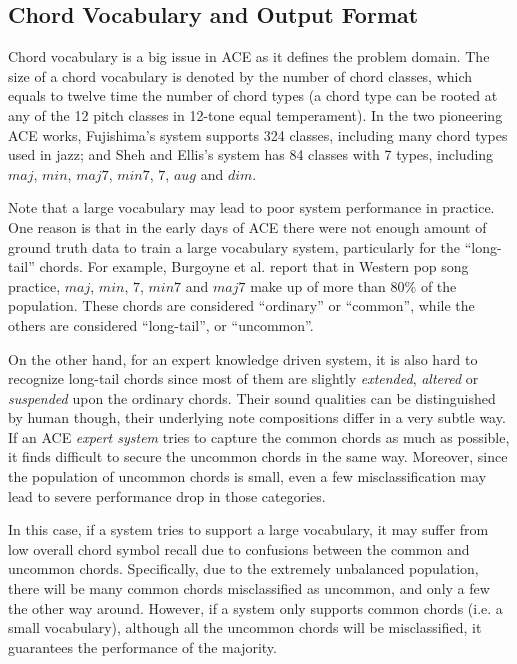 \subsection{Chord Vocabulary and Output Format} \label{sec:2-vocab}
Chord vocabulary is a big issue in ACE as it defines the problem domain. The size of a chord vocabulary is denoted by the number of chord classes, which equals to twelve time the number of chord types (a chord type can be rooted at any of the 12 pitch classes in 12-tone equal temperament). In the two pioneering ACE works, Fujishima's system \cite{fujishima1999realtime} supports 324 classes, including many chord types used in jazz; and Sheh and Ellis's system \cite{sheh2003chord} has 84 classes with 7 types, including $maj$, $min$, $maj7$, $min7$, $7$, $aug$ and $dim$.

Note that a large vocabulary may lead to poor system performance in practice. One reason is that in the early days of ACE there were not enough amount of ground truth data to train a large vocabulary system, particularly for the ``long-tail'' chords. For example, Burgoyne et al. \cite{burgoyne2011expert} report that in Western pop song practice, $maj$, $min$, $7$, $min7$ and $maj7$ make up of more than $80\%$ of the population. These chords are considered ``ordinary'' or ``common'', while the others are considered ``long-tail'', or ``uncommon''.

On the other hand, for an expert knowledge driven system, it is also hard to recognize long-tail chords since most of them are slightly {\it extended}, {\it altered} or {\it suspended} upon the ordinary chords. Their sound qualities can be distinguished by human though, their underlying note compositions differ in a very subtle way. If an ACE {\it expert system} tries to capture the common chords as much as possible, it finds difficult to secure the uncommon chords in the same way. Moreover, since the population of uncommon chords is small, even a few misclassification may lead to severe performance drop in those categories.

In this case, if a system tries to support a large vocabulary, it may suffer from low overall chord symbol recall due to confusions between the common and uncommon chords. Specifically, due to the extremely unbalanced population, there will be many common chords misclassified as uncommon, and only a few the other way around. However, if a system only supports common chords (i.e. a small vocabulary), although all the uncommon chords will be misclassified, it guarantees the performance of the majority.


